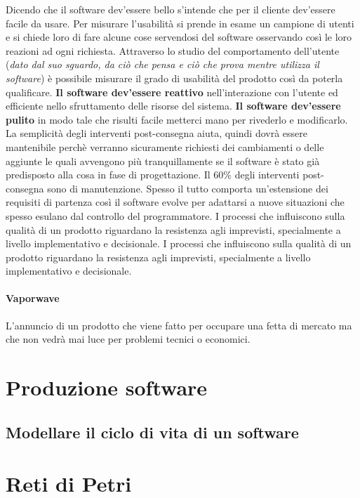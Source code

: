 \documentclass[12pt, twoside, letterpaper]{article}
\begin{document}
		Dicendo che il software dev'essere bello s'intende che per il cliente dev'essere facile da usare. Per misurare l'usabilità si prende in esame un campione di utenti e si chiede loro di fare alcune cose servendosi del software osservando così le loro reazioni ad ogni richiesta. Attraverso lo studio del comportamento dell'utente (\textit{dato dal suo sguardo, da ciò che pensa e ciò che prova mentre utilizza il software}) è possibile misurare il grado di usabilità del prodotto così da poterla qualificare. \textbf{Il software dev'essere reattivo} nell'interazione con l'utente ed efficiente nello sfruttamento delle risorse del sistema. \textbf{Il software dev'essere pulito} in modo tale che risulti facile metterci mano per rivederlo e modificarlo.
		La semplicità degli interventi post-consegna aiuta, quindi dovrà essere mantenibile perchè verranno sicuramente richiesti dei cambiamenti o delle aggiunte le quali avvengono più tranquillamente se il software è stato già predisposto alla cosa in fase di progettazione. Il 60\% degli interventi post-consegna sono di manutenzione. Spesso il tutto comporta un'estensione dei requisiti di partenza così il software evolve per adattarsi a nuove situazioni che spesso esulano dal controllo del programmatore. I processi che influiscono sulla qualità di un prodotto riguardano la resistenza agli imprevisti, specialmente a livello implementativo e decisionale. I processi che influiscono sulla qualità di un prodotto riguardano la resistenza agli imprevisti, specialmente a livello implementativo e decisionale. 
		\paragraph{Vaporwave} L'annuncio di un prodotto che viene fatto per occupare una fetta di mercato ma che non vedrà mai luce per problemi tecnici o economici.
		
	\section{Produzione software}
		\subsection{Modellare il ciclo di vita di un software}
			
\newpage			
	\section{Reti di Petri}
\end{document}
